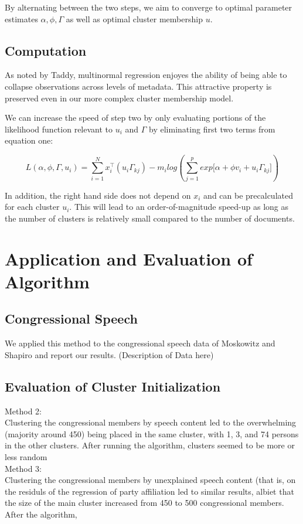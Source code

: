 \documentclass[12pt]{article}
\begin{document}
By alternating between the two steps, we aim to converge to optimal
parameter estimates $\alpha, \phi, \Gamma$ as well as optimal cluster
membership $u$.
\subsection{Computation}\label{computation}
As noted by Taddy, multinormal regression enjoyes the ability of being able to
collapse observations across levels of metadata. This attractive
property is preserved even in our more complex cluster membership model.

We can increase the speed of step two by only evaluating portions of the likelihood function relevant to $u_i$ and $\Gamma$ by eliminating first two terms from equation one:

\begin{equation} 
L(\alpha,\phi,\Gamma,u_i) = \sum_{i = 1}^{N}{ x_i^\top (u_i \Gamma_{kj})} - m_i log(\sum_{j = 1}^{p}{exp{\big[ \alpha + \phi v_i + u_i \Gamma_{kj} \big]}})
\end{equation}

In addition, the right hand side does not depend on $x_i$ and can be precalculated for each cluster $u_i$. This will lead to an order-of-magnitude speed-up as long as the number of clusters is relatively small compared to the number of documents. 



\section{Application and Evaluation of Algorithm}\label{application}

\subsection{Congressional Speech} 

We applied this method to the congressional speech data of Moskowitz and Shapiro and report our results. (Description of Data here)
\subsection{Evaluation of Cluster Initialization} 
Method 2: \\
Clustering the congressional members by speech content led to the overwhelming (majority around 450) being placed in the same cluster, with 1, 3, and 74 persons in the other clusters. After running the algorithm, clusters seemed to be more or less random
\\
Method 3:\\
Clustering the congressional members by unexplained speech content (that is, on the residuls of the regression of party affiliation led to similar results, albiet that the size of the main cluster increased from 450 to 500 congressional members. 
After the algorithm, 
\end{document}
